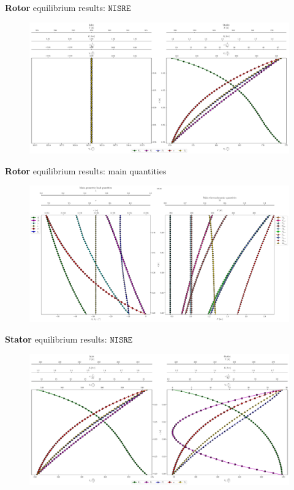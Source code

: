 	\begin{frame}{\textbf{Rotor} equilibrium results: $\mathtt{NISRE}$}
		\begin{figure}
			\centering
			\includegraphics[width=1\textwidth]{figures/rotorEntropyFlow.pdf}
		\end{figure}
	\end{frame}
	
	\begin{frame}{\textbf{Rotor} equilibrium results: main quantities}
		\begin{figure}
			\centering
			\includegraphics[width=1\textwidth]{figures/rotorBetaThermo.pdf}
		\end{figure}
	\end{frame}
	
	\begin{frame}{\textbf{Stator} equilibrium results: $\mathtt{NISRE}$}
		\begin{figure}
			\centering
			\includegraphics[width=1\textwidth]{figures/statorEntropyFlow.pdf}
		\end{figure}
	\end{frame}
	
